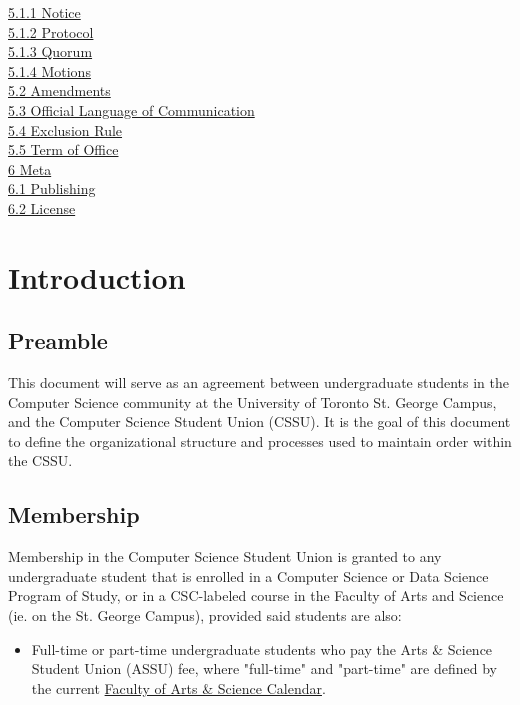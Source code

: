 \documentclass{article}
\begin{document}
\indent \indent \hyperref[sec:5.1.1]{5.1.1 Notice}  \\
\indent \indent \hyperref[sec:5.1.2]{5.1.2 Protocol}  \\
\indent \indent \hyperref[sec:5.1.3]{5.1.3 Quorum}  \\
\indent \indent \hyperref[sec:5.1.4]{5.1.4 Motions}  \\
\indent \hyperref[sec:5.2]{5.2 Amendments}  \\
\indent \hyperref[sec:5.3]{5.3 Official Language of Communication}  \\
\indent \hyperref[sec:5.4]{5.4 Exclusion Rule}  \\
\indent \hyperref[sec:5.5]{5.5 Term of Office}  \\
\hyperref[sec:6]{6 Meta}  \\
\indent \hyperref[sec:6.1]{6.1 Publishing}  \\
\indent \hyperref[sec:6.2]{6.2 License}  \\

\newpage
\section{Introduction} \label{sec:1}
\subsection{Preamble } \label{sec:1.1}
This document will serve as an agreement between undergraduate students in the Computer Science community at the University of Toronto St. George Campus, and the Computer Science Student Union (CSSU). It is the goal of this document to define the organizational structure and processes used to maintain order within the CSSU.
\subsection{Membership } \label{sec:1.2}
Membership in the Computer Science Student Union is granted to any undergraduate student that is enrolled in a Computer Science or Data Science Program of Study, or in a CSC-labeled course in the Faculty of Arts and Science (ie. on the St. George Campus), provided said students are also:
\begin{itemize}
    \item Full-time or part-time undergraduate students who pay the Arts \& Science Student Union (ASSU) fee, where "full-time" and "part-time" are defined by the current \href{https://fas.calendar.utoronto.ca/}{Faculty of Arts \& Science Calendar}.
\end{itemize}
\end{document}
